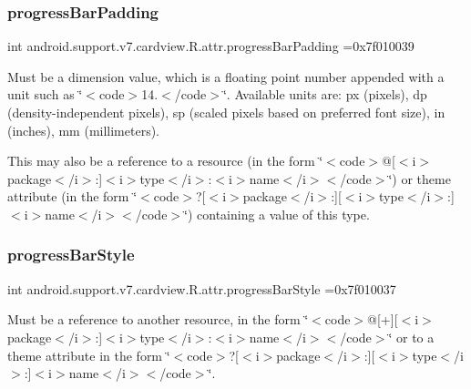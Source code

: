 \subsubsection{\texorpdfstring{progress\+Bar\+Padding}{progressBarPadding}}
{\footnotesize\ttfamily int android.\+support.\+v7.\+cardview.\+R.\+attr.\+progress\+Bar\+Padding =0x7f010039\hspace{0.3cm}{\ttfamily [static]}}

Must be a dimension value, which is a floating point number appended with a unit such as \char`\"{}$<$code$>$14.\+5sp$<$/code$>$\char`\"{}. Available units are\+: px (pixels), dp (density-\/independent pixels), sp (scaled pixels based on preferred font size), in (inches), mm (millimeters). 

This may also be a reference to a resource (in the form \char`\"{}$<$code$>$@\mbox{[}$<$i$>$package$<$/i$>$\+:\mbox{]}$<$i$>$type$<$/i$>$\+:$<$i$>$name$<$/i$>$$<$/code$>$\char`\"{}) or theme attribute (in the form \char`\"{}$<$code$>$?\mbox{[}$<$i$>$package$<$/i$>$\+:\mbox{]}\mbox{[}$<$i$>$type$<$/i$>$\+:\mbox{]}$<$i$>$name$<$/i$>$$<$/code$>$\char`\"{}) containing a value of this type. \mbox{\label{classandroid_1_1support_1_1v7_1_1cardview_1_1R_1_1attr_ad468367fc676d8428c2d4cd2e10ed43e}} 
\subsubsection{\texorpdfstring{progress\+Bar\+Style}{progressBarStyle}}
{\footnotesize\ttfamily int android.\+support.\+v7.\+cardview.\+R.\+attr.\+progress\+Bar\+Style =0x7f010037\hspace{0.3cm}{\ttfamily [static]}}

Must be a reference to another resource, in the form \char`\"{}$<$code$>$@\mbox{[}+\mbox{]}\mbox{[}$<$i$>$package$<$/i$>$\+:\mbox{]}$<$i$>$type$<$/i$>$\+:$<$i$>$name$<$/i$>$$<$/code$>$\char`\"{} or to a theme attribute in the form \char`\"{}$<$code$>$?\mbox{[}$<$i$>$package$<$/i$>$\+:\mbox{]}\mbox{[}$<$i$>$type$<$/i$>$\+:\mbox{]}$<$i$>$name$<$/i$>$$<$/code$>$\char`\"{}. \mbox{\label{classandroid_1_1support_1_1v7_1_1cardview_1_1R_1_1attr_a30fab5bf72caa0de9371b3efcfdd5074}} 
